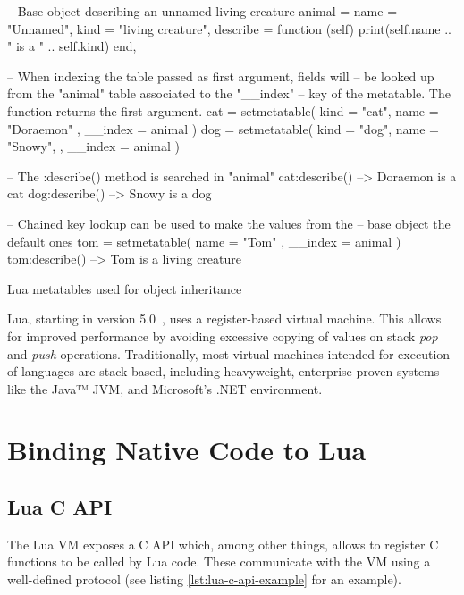 \begin{listing}
  \begin{luacode}
    -- Base object describing an unnamed living creature
    animal = {
      name = "Unnamed",
      kind = "living creature",
      describe = function (self)
        print(self.name .. " is a " .. self.kind)
      end,
    }

    -- When indexing the table passed as first argument, fields will
    -- be looked up from the "animal" table associated to the "__index"
    -- key of the metatable. The function returns the first argument.
    cat = setmetatable({ kind = "cat", name = "Doraemon" },
                       { __index = animal })
    dog = setmetatable({ kind = "dog", name = "Snowy", },
                       { __index = animal })

    -- The :describe() method is searched in "animal"
    cat:describe()  --> Doraemon is a cat
    dog:describe()  --> Snowy is a dog

    -- Chained key lookup can be used to make the values from the
    -- base object the default ones
    tom = setmetatable({ name = "Tom" }, { __index = animal  })
    tom:describe()  --> Tom is a living creature
  \end{luacode}
  \caption{Lua metatables used for object inheritance}
  \label{lst:lua-example-meta-oo}
\end{listing}

Lua, starting in version 5.0~\cite{lua50-impl}, uses a register-based virtual
machine. This allows for improved performance by avoiding excessive copying of
values on stack \emph{pop} and \emph{push} operations. Traditionally, most
virtual machines intended for execution of languages are stack based,
including heavyweight, enterprise-proven systems like the Java™ JVM, and
Microsoft's .NET environment.


\section{Binding Native Code to Lua}

\subsection{Lua C API}
	\label{sec:lua-c-api}

The Lua \gls{VM} exposes a C \gls{API} which, among other things, allows to
register C functions to be called by Lua code. These communicate with the VM
using a well-defined protocol (see listing \ref{lst:lua-c-api-example}
for an example).

